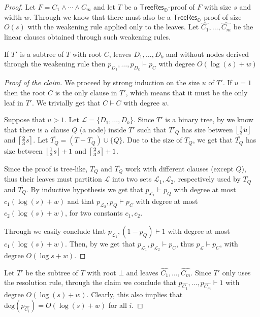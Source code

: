 \begin{proof}
 Let $F = C_1 \land \cdots \land C_m$ and let $T$ be a $\mathsf{TreeRes}_\oplus$-proof of $F$ with size $s$ and width $w$. Through  we know that there must also be a $\mathsf{TreeRes}_\oplus$-proof of size $O(s)$ with the weakening rule applied only to the leaves. Let $\widehat{C_1}, \ldots, \widehat{C_m}$ be the linear clauses obtained through such weakening rules.
    
    \begin{claimtheorem}
 If $T'$ is a subtree of $T$ with root $C$, leaves $D_1, \ldots, D_k$ and without nodes derived through the weakening rule then $p_{D_1}, \ldots, p_{D_k} \vdash p_C$ with degree $O(\log (s) + w)$
    \end{claimtheorem}

    \begin{proof}[Proof of the claim]
 We proceed by strong induction on the size $u$ of $T'$. If $u = 1$ then the root $C$ is the only clause in $T'$, which means that it must be the only leaf in $T'$. We trivially get that $C \vdash C$ with degree $w$.
        
 Suppose that $u > 1$. Let $\mathcal{L} = \{D_1, \ldots, D_k\}$. Since $T'$ is a binary tree, by  we know that there is a clause $Q$ (a node) inside $T'$ such that $T'_{Q}$ has size between $\left \lfloor \frac{1}{3} u \right \rfloor$ and $\left \lceil \frac{2}{3} s \right \rceil$. Let $\overline{T_Q} = (T - T_{Q}) \cup \{Q\}$. Due to the size of $T_{Q}$, we get that $\overline{T_{Q}}$ has size between $\left \lfloor \frac{1}{3} s \right \rfloor+1$ and $\left \lceil \frac{2}{3} s \right \rceil+1$. 
    
 Since the proof is tree-like, $T_{Q}$ and $\overline{T_Q}$ work with different clauses (except $Q$), thus their leaves must partition $\mathcal{L}$ into two sets $\mathcal{L}_1, \mathcal{L}_2$, respectively used by $T_{Q}$ and $\overline{T_Q}$. By inductive hypothesis we get that $p_{\mathcal{L}_1} \vdash p_Q$ with degree at most $c_1(\log(s) + w)$ and that $p_{\mathcal{L}_2}, p_Q \vdash p_C$ with degree at most $c_2(\log(s) + w)$, for two constants $c_1, c_2$.
        
 Through  we easily conclude that $p_{\mathcal{L}_1}, (1-p_{Q})\vdash 1$ with degree at most $c_1(\log(s) + w)$. Then, by  we get that $p_{\mathcal{L}_1}, p_{\mathcal{L}_2} \vdash p_C$, thus $p_\mathcal{L} \vdash p_C$, with degree $O(\log s + w)$.
    \end{proof}

 Let $T'$ be the subtree of $T$ with root $\bot$ and leaves $\widehat{C_1}, \ldots, \widehat{C_m}$. Since $T'$ only uses the resolution rule, through the claim we conclude that $p_{\widehat{C_1}}, \ldots, p_{\widehat{C_m}} \vdash 1$ with degree $O(\log(s)+w)$. Clearly, this also implies that $\mathrm{deg}(p_{\widehat{C_i}}) = O(\log(s)+w)$ for all $i$.
    

\end{proof}
